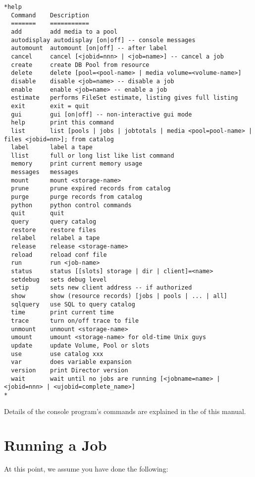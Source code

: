 \footnotesize
\begin{verbatim}
*help
  Command    Description
  =======    ===========
  add        add media to a pool
  autodisplay autodisplay [on|off] -- console messages
  automount  automount [on|off] -- after label
  cancel     cancel [<jobid=nnn> | <job=name>] -- cancel a job
  create     create DB Pool from resource
  delete     delete [pool=<pool-name> | media volume=<volume-name>]
  disable    disable <job=name> -- disable a job
  enable     enable <job=name> -- enable a job
  estimate   performs FileSet estimate, listing gives full listing
  exit       exit = quit
  gui        gui [on|off] -- non-interactive gui mode
  help       print this command
  list       list [pools | jobs | jobtotals | media <pool=pool-name> |
files <jobid=nn>]; from catalog
  label      label a tape
  llist      full or long list like list command
  memory     print current memory usage
  messages   messages
  mount      mount <storage-name>
  prune      prune expired records from catalog
  purge      purge records from catalog
  python     python control commands
  quit       quit
  query      query catalog
  restore    restore files
  relabel    relabel a tape
  release    release <storage-name>
  reload     reload conf file
  run        run <job-name>
  status     status [[slots] storage | dir | client]=<name>
  setdebug   sets debug level
  setip      sets new client address -- if authorized
  show       show (resource records) [jobs | pools | ... | all]
  sqlquery   use SQL to query catalog
  time       print current time
  trace      turn on/off trace to file
  unmount    unmount <storage-name>
  umount     umount <storage-name> for old-time Unix guys
  update     update Volume, Pool or slots
  use        use catalog xxx
  var        does variable expansion
  version    print Director version
  wait       wait until no jobs are running [<jobname=name> | <jobid=nnn> | <ujobid=complete_name>]
*
\end{verbatim}
\normalsize

Details of the console program's commands are explained in the 
 of this manual. 

\section{Running a Job}
\label{Running}

At this point, we assume you have done the following: 

